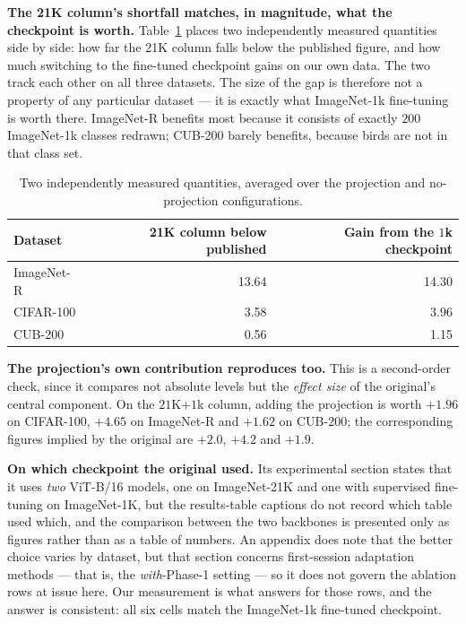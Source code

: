 \documentclass[11pt,a4paper]{article}
\begin{document}
\textbf{The 21K column's shortfall matches, in magnitude, what the checkpoint is
worth.} Table~\ref{tab:backbone-delta} places two independently measured
quantities side by side: how far the 21K column falls below the published
figure, and how much switching to the fine-tuned checkpoint gains on our own
data. The two track each other on all three datasets. The size of the gap is
therefore not a property of any particular dataset --- it is exactly what
ImageNet-1k fine-tuning is worth there. ImageNet-R benefits most because it
consists of exactly $200$ ImageNet-1k classes redrawn; CUB-200 barely benefits,
because birds are not in that class set.

\begin{table}[htbp]
\centering
\caption{Two independently measured quantities, averaged over the projection and
no-projection configurations.}
\label{tab:backbone-delta}
\begin{tabular}{@{}lrr@{}}
\toprule
Dataset & 21K column below published & Gain from the $1$k checkpoint \\
\midrule
ImageNet-R & 13.64 & 14.30 \\
CIFAR-100  & \ \ 3.58 & \ \ 3.96 \\
CUB-200    & \ \ 0.56 & \ \ 1.15 \\
\bottomrule
\end{tabular}
\end{table}

\textbf{The projection's own contribution reproduces too.} This is a
second-order check, since it compares not absolute levels but the \emph{effect
size} of the original's central component. On the $21$K$+1$k column, adding the
projection is worth $+1.96$ on CIFAR-100, $+4.65$ on ImageNet-R and $+1.62$ on
CUB-200; the corresponding figures implied by the original are $+2.0$, $+4.2$
and $+1.9$.

\textbf{On which checkpoint the original used.} Its experimental section states
that it uses \emph{two} ViT-B/16 models, one on ImageNet-21K and one with
supervised fine-tuning on ImageNet-1K, but the results-table captions do not
record which table used which, and the comparison between the two backbones is
presented only as figures rather than as a table of numbers. An appendix does
note that the better choice varies by dataset, but that section concerns
first-session adaptation methods --- that is, the \emph{with}-Phase-1 setting ---
so it does not govern the ablation rows at issue here. Our measurement is what
answers for those rows, and the answer is consistent: all six cells match the
ImageNet-1k fine-tuned checkpoint.
\end{document}
